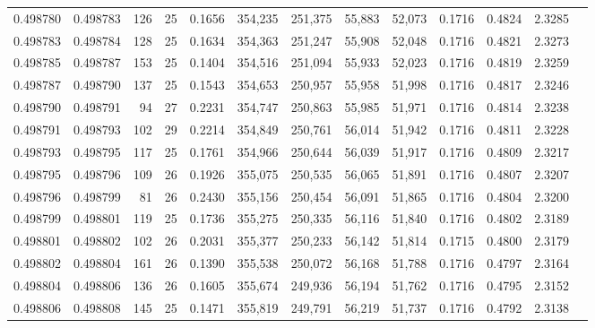 \begin{tabular}{rrrrrrrrrrrrr}
0.498780 & 0.498783 & 126 &  25 &                                     0.1656 & 354,235 & 251,375 &  55,883 &  52,073 & 0.1716 & 0.4824 & 2.3285 \\
0.498783 & 0.498784 & 128 &  25 &                                     0.1634 & 354,363 & 251,247 &  55,908 &  52,048 & 0.1716 & 0.4821 & 2.3273 \\
0.498785 & 0.498787 & 153 &  25 &                                     0.1404 & 354,516 & 251,094 &  55,933 &  52,023 & 0.1716 & 0.4819 & 2.3259 \\
0.498787 & 0.498790 & 137 &  25 &                                     0.1543 & 354,653 & 250,957 &  55,958 &  51,998 & 0.1716 & 0.4817 & 2.3246 \\
0.498790 & 0.498791 &  94 &  27 &                                     0.2231 & 354,747 & 250,863 &  55,985 &  51,971 & 0.1716 & 0.4814 & 2.3238 \\
0.498791 & 0.498793 & 102 &  29 &                                     0.2214 & 354,849 & 250,761 &  56,014 &  51,942 & 0.1716 & 0.4811 & 2.3228 \\
0.498793 & 0.498795 & 117 &  25 &                                     0.1761 & 354,966 & 250,644 &  56,039 &  51,917 & 0.1716 & 0.4809 & 2.3217 \\
0.498795 & 0.498796 & 109 &  26 &                                     0.1926 & 355,075 & 250,535 &  56,065 &  51,891 & 0.1716 & 0.4807 & 2.3207 \\
0.498796 & 0.498799 &  81 &  26 &                                     0.2430 & 355,156 & 250,454 &  56,091 &  51,865 & 0.1716 & 0.4804 & 2.3200 \\
0.498799 & 0.498801 & 119 &  25 &                                     0.1736 & 355,275 & 250,335 &  56,116 &  51,840 & 0.1716 & 0.4802 & 2.3189 \\
0.498801 & 0.498802 & 102 &  26 &                                     0.2031 & 355,377 & 250,233 &  56,142 &  51,814 & 0.1715 & 0.4800 & 2.3179 \\
0.498802 & 0.498804 & 161 &  26 &                                     0.1390 & 355,538 & 250,072 &  56,168 &  51,788 & 0.1716 & 0.4797 & 2.3164 \\
0.498804 & 0.498806 & 136 &  26 &                                     0.1605 & 355,674 & 249,936 &  56,194 &  51,762 & 0.1716 & 0.4795 & 2.3152 \\
0.498806 & 0.498808 & 145 &  25 &                                     0.1471 & 355,819 & 249,791 &  56,219 &  51,737 & 0.1716 & 0.4792 & 2.3138 \\

\end{tabular}
